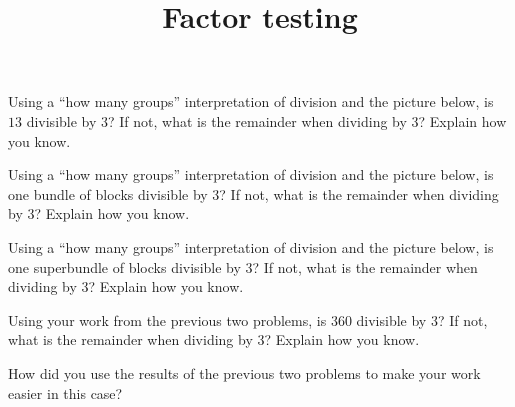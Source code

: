 \documentclass[nooutcomes,noauthor]{ximera}
\title{Factor testing}
\begin{document}
\begin{abstract}
\end{abstract}

\maketitle


\begin{problem}
Using a ``how many groups'' interpretation of division and the picture below, is $13$ divisible by $3$? If not, what is the remainder when dividing by $3$? Explain how you know.

\begin{image} \end{image}
\end{problem}

\begin{problem}
Using a ``how many groups'' interpretation of division and the picture below, is one bundle of blocks divisible by $3$? If not, what is the remainder when dividing by $3$? Explain how you know.

\begin{center} \end{center}
\end{problem}


\begin{problem}
Using a ``how many groups'' interpretation of division and the picture below, is one superbundle of blocks divisible by $3$? If not, what is the remainder when dividing by $3$? Explain how you know.

\begin{image} \end{image}
\end{problem}

\newpage

\begin{problem}
Using your work from the previous two problems, is $360$ divisible by $3$? If not, what is the remainder when dividing by $3$? Explain how you know.

\begin{image} \end{image}

How did you use the results of the previous two problems to make your work easier in this case?
\end{problem}
\end{document}
